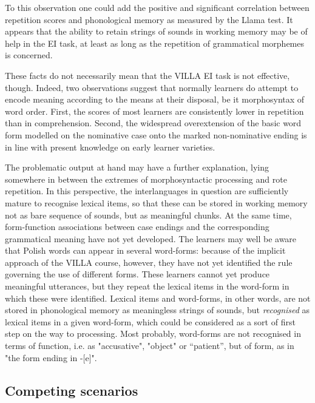 To this observation one could add the positive and significant correlation between repetition scores and phonological memory as measured by the Llama test. It appears that the ability to retain strings of sounds in working memory may be of help in the EI task, at least as long as the repetition of grammatical morphemes is concerned.

These facts do not necessarily mean that the VILLA EI task is not effective, though. Indeed, two observations suggest that normally learners do attempt to encode meaning according to the means at their disposal, be it morphosyntax of word order. First, the scores of most learners are consistently lower in repetition than in comprehension. Second, the widespread overextension of the basic word form modelled on the nominative case onto the marked non-nominative ending is in line with present knowledge on early learner varieties. 

The problematic output at hand may have a further explanation, lying somewhere in between the extremes of morphosyntactic processing and rote repetition. In this perspective, the interlanguages in question are sufficiently mature to recognise lexical items, so that these can be stored in working memory not as bare sequence of sounds, but as meaningful chunks. At the same time, form-function associations between case endings and the corresponding grammatical meaning have not yet developed. The learners may well be aware that Polish words can appear in several word-forms: because of the implicit approach of the VILLA course, however, they have not yet identified the rule governing the use of different forms. These learners cannot yet produce meaningful utterances, but they repeat the lexical items in the word-form in which these were identified. Lexical items and word-forms, in other words, are not stored in phonological memory as meaningless strings of sounds, but \textit{recognised} as lexical items in a given word-form, which could be considered as a sort of first step on the way to processing. Most probably, word-forms are not recognised in terms of function, i.e. as "accusative", "object" or “patient”, but of form, as in "the form ending in -[e]".

\subsection{Competing scenarios}\label{sec:08:4.3}

